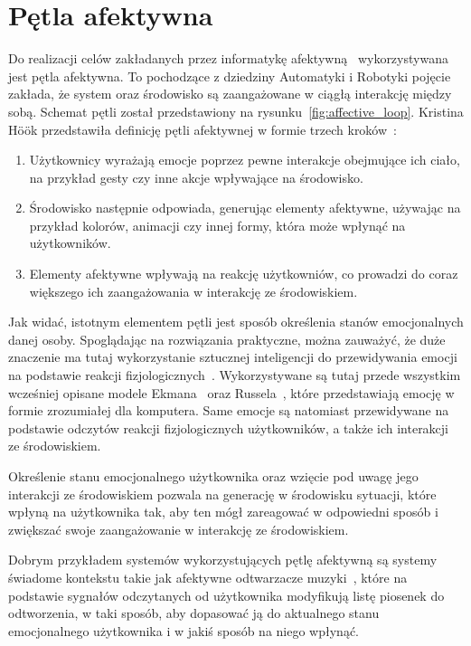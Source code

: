 \section{Pętla afektywna}
Do realizacji celów zakładanych przez informatykę afektywną~\cite{Picard:1997:AC:265013} wykorzystywana jest pętla afektywna. To pochodzące z dziedziny Automatyki i Robotyki pojęcie zakłada, że system oraz środowisko są zaangażowane w ciągłą interakcję między sobą. Schemat pętli został przedstawiony na rysunku~\ref{fig:affective_loop}. Kristina Höök przedstawiła definicję pętli afektywnej w formie trzech kroków~\cite{affective_loop_experiences}:
\begin{enumerate}
	\item Użytkownicy wyrażają emocje poprzez pewne  interakcje obejmujące ich ciało, na przykład gesty czy inne akcje wpływające na środowisko.
	\item Środowisko następnie odpowiada, generując elementy afektywne, używając na przykład kolorów, animacji czy innej formy, która może wpłynąć na użytkowników.
	\item Elementy afektywne wpływają na reakcję użytkowniów, co prowadzi do coraz większego ich zaangażowania w interakcję ze środowiskiem.
\end{enumerate}

Jak widać, istotnym elementem pętli jest sposób określenia stanów emocjonalnych danej osoby. Spoglądając na rozwiązania praktyczne, można zauważyć, że duże znaczenie ma tutaj wykorzystanie sztucznej inteligencji do przewidywania emocji na podstawie reakcji fizjologicznych~\cite{emotional_context_geist_2019}. Wykorzystywane są tutaj przede wszystkim wcześniej opisane modele Ekmana~\cite{Ekman1971ConstantsAC} oraz Russela~\cite{circumplex_model_russel_1980}, które przedstawiają emocję w formie zrozumiałej dla komputera. Same emocje są natomiast przewidywane na podstawie odczytów reakcji fizjologicznych użytkowników, a także ich interakcji ze środowiskiem.

Określenie stanu emocjonalnego użytkownika oraz wzięcie pod uwagę jego interakcji ze środowiskiem pozwala na generację w środowisku sytuacji, które wpłyną na użytkownika tak, aby ten mógł zareagować w odpowiedni sposób i zwiększać swoje zaangażowanie w interakcję ze środowiskiem. 

Dobrym przykładem systemów wykorzystujących pętlę afektywną są systemy świadome kontekstu takie jak afektywne odtwarzacze muzyki~\cite{Janssen2012,ChrzanowskaInzynierska}, które na podstawie sygnałów odczytanych od użytkownika modyfikują listę piosenek do odtworzenia, w taki sposób, aby dopasować ją do aktualnego stanu emocjonalnego użytkownika i w jakiś sposób na niego wpłynąć.

